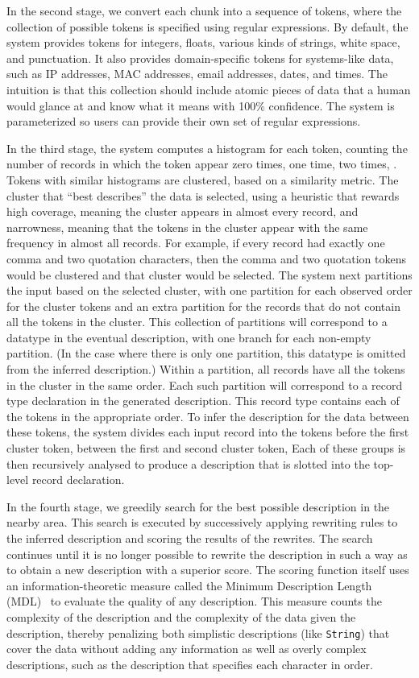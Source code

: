 \documentclass{sig-alternate}
\begin{document}
In the second stage, we convert each chunk into a sequence of tokens,
where the collection of possible tokens is specified using regular
expressions.  By default, the system provides tokens for integers,
floats, various kinds of strings, white space, and punctuation.  It
also provides domain-specific tokens for systems-like data, such as IP
addresses, MAC addresses, email addresses, dates, and times.  The
intuition is that this collection should include atomic pieces of data
that a human would glance at and know what it means with 100\%
confidence.   The system is parameterized so users can provide their
own set of regular expressions. 

In the third stage, the system computes a histogram for each token,
counting the number of records in which the token appear zero times,
one time, two times, \etc.  Tokens with similar histograms are
clustered, based on a similarity metric.  The cluster that ``best
describes'' the data is selected, using a heuristic that rewards high
coverage, meaning the cluster appears in almost every record, and
narrowness, meaning that the tokens in the cluster appear with the
same frequency in almost all records.  For example, if every record
had exactly one comma and two quotation characters, then the comma and
two quotation tokens would be clustered and that cluster would be
selected.  The system next partitions the input based on the selected
cluster, with one partition for each observed order for the cluster
tokens and an extra partition for the records that do not contain all
the tokens in the cluster.  This collection of partitions will
correspond to a datatype in the eventual description, with one branch
for each non-empty partition.  (In the case where there is only one
partition, this datatype is omitted from the inferred description.)
Within a partition, all records have all the tokens in the cluster in
the same order.  Each such partition will correspond to a record type
declaration in the generated description. This record type contains
each of the tokens in the appropriate order.  To infer the description
for the data between these tokens, the system divides each input
record into the tokens before the first cluster token, between the
first and second cluster token, \etc{} Each of these groups is then
recursively analysed to produce a description that is slotted into the
top-level record declaration.

In the fourth stage, we greedily search for the best possible description
in the nearby area.
This search is executed by successively applying rewriting 
rules to the inferred description and scoring the results of the
rewrites.  The search continues until it is no longer possible to
rewrite the description in such a way as to obtain a new description
with a superior score.  The scoring function itself
uses an information-theoretic measure called
the Minimum Description Length (MDL)~\cite{mdlbook} to evaluate the
quality of any description.  This measure counts the complexity of the description
and the complexity of the data given the description, thereby
penalizing both simplistic descriptions (like \texttt{String}) that
cover the data without adding any information as well as overly
complex descriptions, such as the description that specifies each
character in order.  
\end{document}
